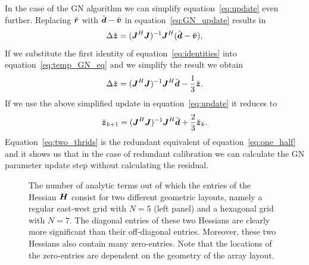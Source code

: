 \documentclass[useAMS,usenatbib]{mn2e}
\newcommand{\bz}{\bmath{z}}
\newcommand{\br}{\bmath{r}}
\newcommand{\bd}{\bmath{d}}
\newcommand{\bv}{\bmath{v}}
\newcommand{\bJ}{\bmath{J}}
\newcommand{\bH}{\bmath{H}}
\begin{document}
In the case of the GN algorithm we can simplify equation~\ref{eq:update} even further. Replacing $\breve{\br}$ with $\breve{\bd}-\breve{\bv}$ in equation~\ref{eq:GN_update} results in
\begin{equation}
\label{eq:temp_GN_eq}
\Delta \breve{\bz} = (\bJ^H\bJ)^{-1}\bJ^H(\breve{\bd}-\breve{\bv}), 
\end{equation}
If we substitute the first identity of equation~\ref{eq:identities} into equation~\ref{eq:temp_GN_eq} and we simplify the 
result we obtain 
\begin{equation}
\label{eq:one_thrid}
\Delta \breve{\bz} = (\bJ^H\bJ)^{-1}\bJ^H\breve{\bd}-\frac{1}{3}\breve{\bz}.
\end{equation}
If we use the above simplified update in equation~\ref{eq:update} it reduces to
\begin{equation}
\label{eq:two_thrids}
\breve{\bz}_{k+1} = (\bJ^H\bJ)^{-1}\bJ^H\breve{\bd} + \frac{2}{3}\breve{\bz}_{k}. 
\end{equation}
Equation~\ref{eq:two_thrids} is the redundant equivalent of equation~\ref{eq:one_half} and it shows us that in the case of redundant calibration we can calculate the GN parameter update step without calculating the residual.  

\begin{figure}
\centering
{}
\caption{The number of analytic terms out of which the entries of the Hessian $\bH$ consist for two different geometric layouts, namely a regular east-west grid with $N = 5$ (left panel) and 
a hexagonal grid with $N = 7$. The diagonal entries of these two Hessians are clearly more significant than their off-diagonal entries. Moreover, these two Hessians also 
contain many zero-entries. Note that the locations of the zero-entries are dependent on the geometry of the array layout.
\label{fig:hessian}} 
\end{figure}
\end{document}
